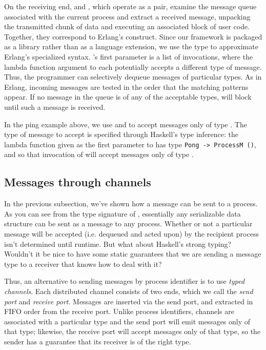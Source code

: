 \documentclass[preprint]{sigplanconf}
\begin{document}
\begin{itemize}
On the receiving end,  and , which operate as a pair, examine the message queue associated with the current process and extract a received message, unpacking the transmitted chunk of data and executing an associated block of user code. Together, they correspond to Erlang's  construct. Since our framework is packaged as a library rather than as a language extension, we use the  type to approximate Erlang's specialized syntax. 's first parameter is a list of  invocations, where the lambda function argument to each  potentially accepts a different type of message. Thus, the programmer can selectively dequeue messages of particular types. As in Erlang, incoming messages are tested in the order that the matching patterns appear. If no message in the queue is of any of the acceptable types,  will block until such a message is received. %

In the ping example above, we use  and  to accept messages only of type . The type of message to accept is specified through Haskell's type inference: the lambda function given as the first parameter to  has type \lstinline!Pong -> ProcessM ()!, and so that invocation of  will accept messages only of type .
\end{itemize}

\subsection{Messages through channels}
In the previous subsection, we've shown how a message can be sent to a process. As you can see from the type signature of , essentially any serializable data structure can be sent as a message to any process. Whether or not a particular message will be accepted (i.e. dequeued and acted upon) by the recipient process isn't determined until runtime. But what about Haskell's strong typing? Wouldn't it be nice to have some static guarantees that we are sending a message type to a receiver that knows how to deal with it?

Thus, an alternative to sending messages by process identifier is to use {\em typed channels}. Each distributed channel consists of two ends, which we call the {\em send port} and {\em receive port}. Messages are inserted via the send port, and extracted in FIFO order from the receive port. Unlike process identifiers, channels are associated with a particular type and the send port will emit messages only of that type; likewise, the receive port will accept messages only of that type, so the sender has a guarantee that its receiver is of the right type.
\end{document}
